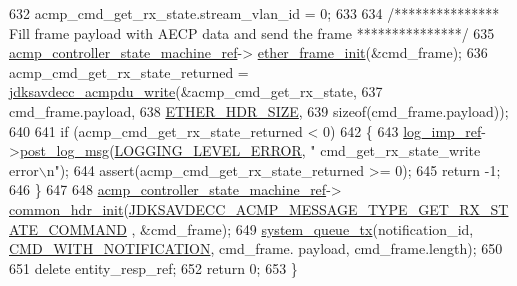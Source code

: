 \begin{DoxyCode}
632     acmp\_cmd\_get\_rx\_state.stream\_vlan\_id = 0;
633 
634     \textcolor{comment}{/*************** Fill frame payload with AECP data and send the frame ***************/}
635     \hyperlink{namespaceavdecc__lib_a693c2049de1d4ec860a92126b846ac21}{acmp\_controller\_state\_machine\_ref}->
      \hyperlink{classavdecc__lib_1_1acmp__controller__state__machine_a0a43868a3e99a6cef740e4562d006345}{ether\_frame\_init}(&cmd\_frame);
636     acmp\_cmd\_get\_rx\_state\_returned = \hyperlink{group__acmpdu_ga8cf8b61ba149419878384da1540d9673}{jdksavdecc\_acmpdu\_write}(&acmp\_cmd\_get\_rx\_state,
637                                                              cmd\_frame.payload,
638                                                              \hyperlink{namespaceavdecc__lib_a6c827b1a0d973e18119c5e3da518e65ca9512ad9b34302ba7048d88197e0a2dc0}{ETHER\_HDR\_SIZE},
639                                                              \textcolor{keyword}{sizeof}(cmd\_frame.payload));
640 
641     \textcolor{keywordflow}{if} (acmp\_cmd\_get\_rx\_state\_returned < 0)
642     \{
643         \hyperlink{namespaceavdecc__lib_acbe3e2a96ae6524943ca532c87a28529}{log\_imp\_ref}->\hyperlink{classavdecc__lib_1_1log_a68139a6297697e4ccebf36ccfd02e44a}{post\_log\_msg}(\hyperlink{namespaceavdecc__lib_a501055c431e6872ef46f252ad13f85cdaf2c4481208273451a6f5c7bb9770ec8a}{LOGGING\_LEVEL\_ERROR}, \textcolor{stringliteral}{"
      cmd\_get\_rx\_state\_write error\(\backslash\)n"});
644         assert(acmp\_cmd\_get\_rx\_state\_returned >= 0);
645         \textcolor{keywordflow}{return} -1;
646     \}
647 
648     \hyperlink{namespaceavdecc__lib_a693c2049de1d4ec860a92126b846ac21}{acmp\_controller\_state\_machine\_ref}->
      \hyperlink{classavdecc__lib_1_1acmp__controller__state__machine_ae93a117baf9620a7311f950271610506}{common\_hdr\_init}(\hyperlink{group__acmp__message__type_ga60d520cb19cf1ccb3677a58730e7abc9}{JDKSAVDECC\_ACMP\_MESSAGE\_TYPE\_GET\_RX\_STATE\_COMMAND}
      , &cmd\_frame);
649     \hyperlink{namespaceavdecc__lib_a6dd511685627c0865a3442b539a4e8e9}{system\_queue\_tx}(notification\_id, \hyperlink{namespaceavdecc__lib_aabcadff06aa62be0ce47bc0646823604aba48b8a017e06fb240b650cdea965178}{CMD\_WITH\_NOTIFICATION}, cmd\_frame.
      payload, cmd\_frame.length);
650 
651     \textcolor{keyword}{delete} entity\_resp\_ref;
652     \textcolor{keywordflow}{return} 0;
653 \}
\end{DoxyCode}


